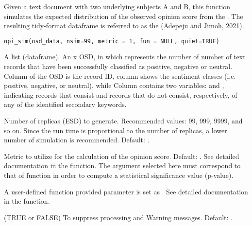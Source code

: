 \documentclass[a4paper]{book}
\begin{document}
%
\begin{Description}\relax
Given a text document with two underlying subjects
A and B, this function simulates the expected distribution of the
observed opinion score from the . The resulting
tidy-format dataframe is referred to as the  (Adepeju and Jimoh, 2021).
\end{Description}
%
\begin{Usage}
\begin{verbatim}
opi_sim(osd_data, nsim=99, metric = 1, fun = NULL, quiet=TRUE)
\end{verbatim}
\end{Usage}
%
\begin{Arguments}
\begin{ldescription}
\item[\code{osd\_data}] A list (dataframe). An  x 
OSD, in which  represents the number of number of
text records that have been successfully classified as
positive, negative or neutral. Column  of the OSD
is the record ID, column  shows the sentiment
classes (i.e. positive, negative, or neutral), while
Column  contains two variables:  and
, indicating records that consist and records
that do not consist, respectively, of any of
the identified secondary keywords.

\item[\code{nsim}]  Number of replicas (ESD) to generate.
Recommended values: 99, 999, 9999, and so on. Since the run time
is proportional to the number of replicas, a lower number of
simulation is recommended. Default: .

\item[\code{metric}]  Metric to utilize for the calculation
of the opinion score. Default: . See detailed documentation
in the  function. The argument selected here must
correspond to that of  function in order to
compute a statistical significance value (p-value).

\item[\code{fun}] A user-defined function provided parameter
 is set as . See detailed documentation
in the  function.

\item[\code{quiet}] (TRUE or FALSE) To suppress processing and Warning
messages. Default: .
\end{ldescription}
\end{Arguments}
\end{document}
